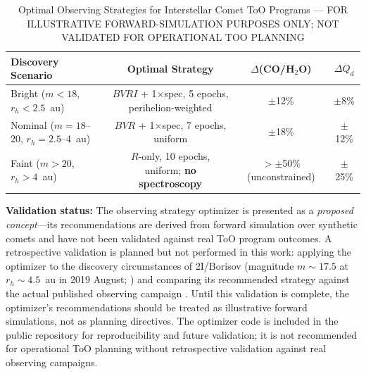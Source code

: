 \documentclass[usenatbib]{mnras}
\newcommand{\tablecomments}[1]{\vspace{4pt}{\footnotesize #1}\vspace{2pt}}
\begin{document}
\begin{table}
\centering
\caption{Optimal Observing Strategies for Interstellar Comet ToO Programs --- FOR ILLUSTRATIVE FORWARD-SIMULATION PURPOSES ONLY; NOT VALIDATED FOR OPERATIONAL TOO PLANNING}\label{tab:obsopt_results}
\begin{tabular}{lccc}
\toprule
Discovery Scenario & Optimal Strategy & $\Delta$(CO/H$_2$O) & $\Delta Q_d$ \\
\midrule
Bright ($m < 18$, $r_h < 2.5$~au) & $BVRI$ + 1$\times$spec, 5 epochs, perihelion-weighted & $\pm$12\% & $\pm$8\% \\
Nominal ($m = 18$--20, $r_h = 2.5$--4~au) & $BVR$ + 1$\times$spec, 7 epochs, uniform & $\pm$18\% & $\pm$12\% \\
Faint ($m > 20$, $r_h > 4$~au) & $R$-only, 10 epochs, uniform; \textbf{no spectroscopy} & $>\pm$50\% (unconstrained) & $\pm$25\% \\
\bottomrule
\end{tabular}
\tablecomments{Results from forward simulation over 1000 synthetic comets per scenario. $\Delta X$ denotes the expected 1$\sigma$ fractional uncertainty on parameter $X$. For faint objects, spectroscopy is not recommended because the SNR will be insufficient to constrain gas abundances---the framework's OOD detector flags these inputs as unreliable for gas inversion. ``$>\pm$50\% (unconstrained)'' means the 1$\sigma$ fractional uncertainty on CO/H$_2$O exceeds 50\%, i.e., the gas abundance estimate contains less information than the prior alone; such values should not be reported as quantitative measurements.}
\end{table}


\textbf{Validation status:} The observing strategy optimizer is presented as a \textit{proposed concept}---its recommendations are derived from forward simulation over synthetic comets and have not been validated against real ToO program outcomes. A retrospective validation is planned but not performed in this work: applying the optimizer to the discovery circumstances of 2I/Borisov (magnitude $m \sim 17.5$ at $r_h \sim 4.5$~au in 2019 August; \citealt{guzik19}) and comparing its recommended strategy against the actual published observing campaign \citep{clements21,bodewits20}. Until this validation is complete, the optimizer's recommendations should be treated as illustrative forward simulations, not as planning directives. The optimizer code is included in the public repository for reproducibility and future validation; it is not recommended for operational ToO planning without retrospective validation against real observing campaigns.
\end{document}
